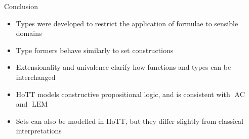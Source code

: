 \documentclass{beamer}
\newcommand{\1}{\textbf{1}}
\newcommand{\0}{\mathbf{0}}
\newcommand{\2}{\textbf{2}}
\DeclareMathOperator{\LEM}{LEM}
\DeclareMathOperator{\AC}{AC}
\begin{document}
\begin{frame}{Conclusion}{}
\begin{itemize}[<+- >]
	\item Types were developed to restrict the application of formulae to sensible domains
	\item Type formers behave similarly to set constructions
	\item Extensionality and univalence clarify how functions and types can be interchanged
	\item HoTT models constructive propositional logic, and is consistent with \( \AC \) and \( \LEM \)
	\item Sets can also be modelled in HoTT, but they differ slightly from classical interpretations
\end{itemize} \end{frame}
\frame[plain]{}























\end{document}
